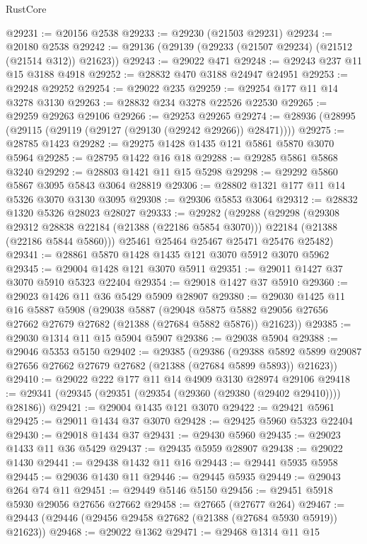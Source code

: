 \begin{lexlean}{RustCore}
\begin{coremodule}
@29231 := @20156 @2538
@29233 := @29230 (@21503 @29231)
@29234 := @20180 @2538
@29242 := @29136 (@29139 (@29233 (@21507 @29234) (@21512 (@21514 @312)) @21623))
@29243 := @29022 @471
@29248 := @29243 @237 @11 @15 @3188 @4918
@29252 := @28832 @470 @3188 @24947 @24951
@29253 := @29248 @29252
@29254 := @29022 @235
@29259 := @29254 @177 @11 @14 @3278 @3130
@29263 := @28832 @234 @3278 @22526 @22530
@29265 := @29259 @29263 @29106
@29266 := @29253 @29265
@29274 := @28936 (@28995 (@29115 (@29119 (@29127 (@29130 (@29242 @29266)) @28471))))
@29275 := @28785 @1423
@29282 := @29275 @1428 @1435 @121 @5861 @5870 @3070 @5964
@29285 := @28795 @1422 @16 @18
@29288 := @29285 @5861 @5868 @3240
@29292 := @28803 @1421 @11 @15 @5298
@29298 := @29292 @5860 @5867 @3095 @5843 @3064 @28819
@29306 := @28802 @1321 @177 @11 @14 @5326 @3070 @3130 @3095
@29308 := @29306 @5853 @3064
@29312 := @28832 @1320 @5326 @28023 @28027
@29333 := @29282
    (@29288
      (@29298
        (@29308 @29312 @28838 @22184 (@21388 (@22186 @5854 @3070)))
        @22184
        (@21388 (@22186 @5844 @5860)))
      @25461
      @25464
      @25467
      @25471
      @25476
      @25482)
@29341 := @28861 @5870 @1428 @1435 @121 @3070 @5912 @3070 @5962
@29345 := @29004 @1428 @121 @3070 @5911
@29351 := @29011 @1427 @37 @3070 @5910 @5323 @22404
@29354 := @29018 @1427 @37 @5910
@29360 := @29023 @1426 @11 @36 @5429 @5909 @28907
@29380 := @29030
    @1425
    @11
    @16
    @5887
    @5908
    (@29038
      @5887
      (@29048 @5875 @5882 @29056 @27656 @27662 @27679 @27682 (@21388 (@27684 @5882 @5876)) @21623))
@29385 := @29030 @1314 @11 @15 @5904 @5907
@29386 := @29038 @5904
@29388 := @29046 @5353 @5150
@29402 := @29385
    (@29386
      (@29388 @5892 @5899 @29087 @27656 @27662 @27679 @27682 (@21388 (@27684 @5899 @5893)) @21623))
@29410 := @29022 @222 @177 @11 @14 @4909 @3130 @28974 @29106
@29418 := @29341 (@29345 (@29351 (@29354 (@29360 (@29380 (@29402 @29410)))) @28186))
@29421 := @29004 @1435 @121 @3070
@29422 := @29421 @5961
@29425 := @29011 @1434 @37 @3070
@29428 := @29425 @5960 @5323 @22404
@29430 := @29018 @1434 @37
@29431 := @29430 @5960
@29435 := @29023 @1433 @11 @36 @5429
@29437 := @29435 @5959 @28907
@29438 := @29022 @1430
@29441 := @29438 @1432 @11 @16
@29443 := @29441 @5935 @5958
@29445 := @29036 @1430 @11
@29446 := @29445 @5935
@29449 := @29043 @264 @74 @11
@29451 := @29449 @5146 @5150
@29456 := @29451 @5918 @5930 @29056 @27656 @27662
@29458 := @27665 (@27677 @264)
@29467 := @29443 (@29446 (@29456 @29458 @27682 (@21388 (@27684 @5930 @5919)) @21623))
@29468 := @29022 @1362
@29471 := @29468 @1314 @11 @15

\end{coremodule}
\end{lexlean}

